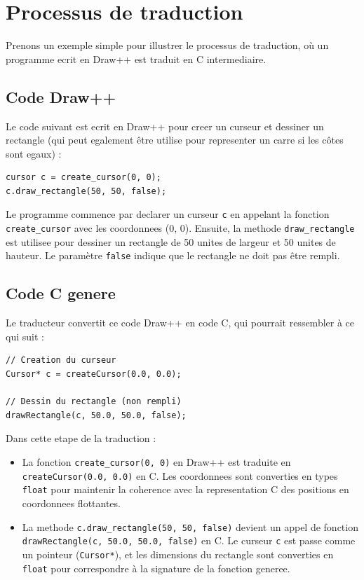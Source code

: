 \documentclass[12pt,a4paper]{report}
\begin{document}
\section{Processus de traduction}
Prenons un exemple simple pour illustrer le processus de traduction, où un programme ecrit en Draw++ est traduit en C intermediaire.

\subsection{Code Draw++}
Le code suivant est ecrit en Draw++ pour creer un curseur et dessiner un rectangle (qui peut egalement être utilise pour representer un carre si les côtes sont egaux) :

\begin{lstlisting}[language=Draw++]
cursor c = create_cursor(0, 0);
c.draw_rectangle(50, 50, false);
\end{lstlisting}

Le programme commence par declarer un curseur \texttt{c} en appelant la fonction \texttt{create\_cursor} avec les coordonnees (0, 0). Ensuite, la methode \texttt{draw\_rectangle} est utilisee pour dessiner un rectangle de 50 unites de largeur et 50 unites de hauteur. Le paramètre \texttt{false} indique que le rectangle ne doit pas être rempli.

\subsection{Code C genere}
Le traducteur convertit ce code Draw++ en code C, qui pourrait ressembler à ce qui suit :

\begin{lstlisting}[language=Draw++]
// Creation du curseur
Cursor* c = createCursor(0.0, 0.0);

// Dessin du rectangle (non rempli)
drawRectangle(c, 50.0, 50.0, false);
\end{lstlisting}

Dans cette etape de la traduction :
\begin{itemize}
    \item La fonction \texttt{create\_cursor(0, 0)} en Draw++ est traduite en \texttt{createCursor(0.0, 0.0)} en C. Les coordonnees sont converties en types \texttt{float} pour maintenir la coherence avec la representation C des positions en coordonnees flottantes.
    \item La methode \texttt{c.draw\_rectangle(50, 50, false)} devient un appel de fonction \texttt{drawRectangle(c, 50.0, 50.0, false)} en C. Le curseur \texttt{c} est passe comme un pointeur (\texttt{Cursor*}), et les dimensions du rectangle sont converties en \texttt{float} pour correspondre à la signature de la fonction generee.
\end{itemize}
\end{document}
